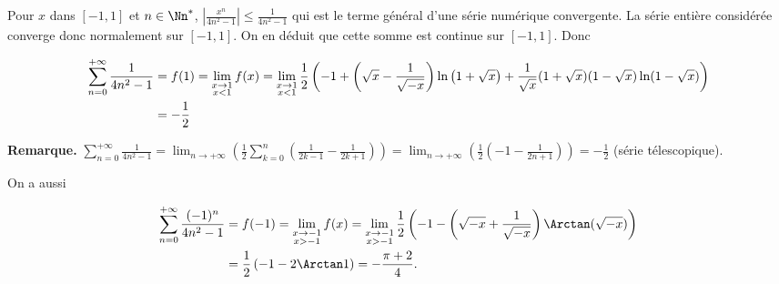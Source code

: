 {{Pour $x$ dans $[-1,1]$ et $n\in\Nn^*$, $\left|\frac{x^n}{4n^2-1}\right|\leqslant\frac{1}{4n^2-1}$ qui est le  terme général d'une série numérique convergente. La série entière considérée converge donc normalement sur $[-1,1]$. On en déduit que cette somme est continue sur $[-1,1]$. Donc 

\begin{align*}\ensuremath
 \sum_{n=0}^{+\infty}\frac{1}{4n^2-1}&=f(1)=\displaystyle\lim_{\substack{x\rightarrow1\\ x<1}}f(x)
=\displaystyle\lim_{\substack{x\rightarrow1\\ x<1}}\frac{1}{2}\left(-1+\left(\sqrt{x}-\frac{1}{\sqrt{-x}} \right)\ln\left(1+\sqrt{x}\right) +\frac{1}{\sqrt{x}}(1+\sqrt{x})(1-\sqrt{x})\ln(1-\sqrt{x})\right)\\
 &=-\frac{1}{2}
\end{align*} 
			

\textbf{Remarque.} $\sum_{n=0}^{+\infty}\frac{1}{4n^2-1}=\lim_{n \rightarrow +\infty}\left(\frac{1}{2}\sum_{k=0}^{n}\left(\frac{1}{2k-1}-\frac{1}{2k+1}\right)\right)=\lim_{n \rightarrow +\infty}\left(\frac{1}{2}\left(-1-\frac{1}{2n+1}\right)\right)=-\frac{1}{2}$ (série télescopique).

On a aussi

\begin{align*}\ensuremath
 \sum_{n=0}^{+\infty}\frac{(-1)^n}{4n^2-1}&=f(-1)=\displaystyle\lim_{\substack{x\rightarrow-1\\ x>-1}}f(x)
=\displaystyle\lim_{\substack{x\rightarrow-1\\ x>-1}}\frac{1}{2}\left(-1-\left(\sqrt{-x}+\frac{1}{\sqrt{-x}} \right)\Arctan(\sqrt{-x})\right)\\
 &=\frac{1}{2}\left(-1-2\Arctan1\right)=-\frac{\pi+2}{4}.
\end{align*}
}
}
